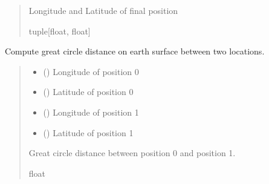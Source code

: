 \documentclass[letterpaper,10pt,english]{sphinxmanual}
\begin{document}
\begin{fulllineitems}
\begin{quote}
\begin{description}
\begin{itemize}
\end{itemize}

\sphinxAtStartPar
{} \textendash{} Longitude and Latitude of final position

\sphinxAtStartPar
tuple{[}float, float{]}

\end{description}\end{quote}

\end{fulllineitems}


\begin{fulllineitems}
\label{\detokenize{users_guide:geotrees.distance_metrics.gcd_slc}}
\pysigstartsignatures
\pysiglinewithargsret
{}
{\sphinxparamcomma {}\sphinxparamcomma {}\sphinxparamcomma {}}
{}
\pysigstopsignatures
\sphinxAtStartPar
Compute great circle distance on earth surface between two locations.
\begin{quote}\begin{description}
\begin{itemize}
\item {}
\sphinxAtStartPar
{} () \textendash{} Longitude of position 0

\item {}
\sphinxAtStartPar
{} () \textendash{} Latitude of position 0

\item {}
\sphinxAtStartPar
{} () \textendash{} Longitude of position 1

\item {}
\sphinxAtStartPar
{} () \textendash{} Latitude of position 1

\end{itemize}

\sphinxAtStartPar
{} \textendash{} Great circle distance between position 0 and position 1.

\sphinxAtStartPar
float

\end{description}\end{quote}

\end{fulllineitems}
\end{document}
